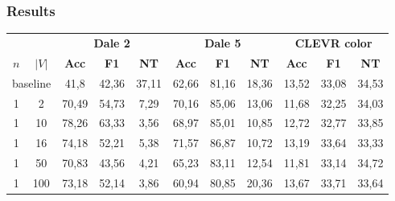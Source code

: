 \subsubsection*{Results}
\begin{table}[ht]
    \centering
    \begin{tabular}{cc|ccc|ccc|ccc}
        \toprule
                                      &        & \multicolumn{3}{c}{\textbf{Dale 2}} & \multicolumn{3}{c}{\textbf{Dale 5}} & \multicolumn{3}{c}{\textbf{CLEVR color}}                                                                                                    \\  \cmidrule(lr){3-5}\cmidrule(lr){6-8}\cmidrule(lr){9-11}
        $n$                           & $|V|$  & \textbf{Acc}                        & \textbf{F1}                         & \textbf{NT}                              & \textbf{Acc}     & \textbf{F1}      & \textbf{NT}     & \textbf{Acc} & \textbf{F1} & \textbf{NT} \\\midrule
        \multicolumn{2}{c|}{baseline} & {41,8} & {42,36}                             & {37,11}                             & {62,66}                                  & {81,16}          & {18,36}          & {13,52}         & {33,08}      & {34,53}                   \\\midrule
        {1}                           & {2}    & {70,49}                             & {54,73}                             & {7,29}                                   & {70,16}          & {85,06}          & {13,06}         & {11,68}      & {32,25}     & {34,03}     \\
        {1}                           & {10}   & {78,26}                             & {63,33}                             & {3,56}                                   & {68,97}          & {85,01}          & {10,85}         & {12,72}      & {32,77}     & {33,85}     \\
        {1}                           & {16}   & {74,18}                             & {52,21}                             & {5,38}                                   & {71,57}          & {86,87}          & {10,72}         & {13,19}      & {33,64}     & {33,33}     \\
        {1}                           & {50}   & {70,83}                             & {43,56}                             & {4,21}                                   & {65,23}          & {83,11}          & {12,54}         & {11,81}      & {33,14}     & {34,72}     \\
        {1}                           & {100}  & {73,18}                             & {52,14}                             & {3,86}                                   & {60,94}          & {80,85}          & {20,36}         & {13,67}      & {33,71}     & {33,64}     \\

\end{tabular}
\end{table}
